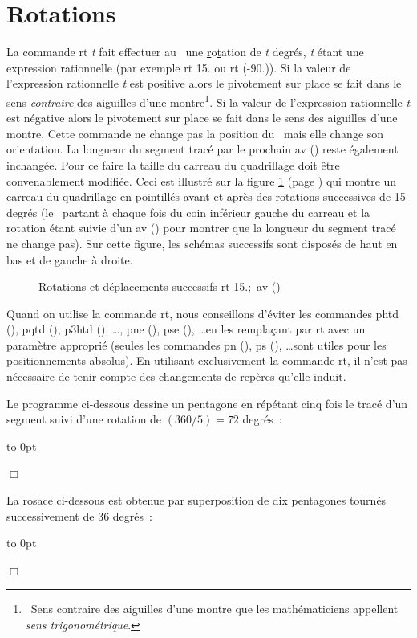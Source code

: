 \section{Rotations}
La commande {\idt rt} {\em t} fait effectuer au \robot\ une \underline{r}o\underline{t}ation de {\em t} degrés,
{\em t} étant une expression rationnelle (par exemple {\idt rt 15.} ou {\idt rt (-90.)}).
Si la valeur de l'expression rationnelle {\em t} est positive alors le pivotement sur place se fait dans le sens 
{\em contraire} des aiguilles d'une montre\footnote{\ Sens contraire des aiguilles d'une montre que les mathématiciens
appellent {\em sens trigonométrique}.}. Si la valeur de l'expression rationnelle {\em t} est négative alors le pivotement sur 
place se fait dans le sens des ai\-guil\-les d'une montre. Cette commande ne change pas la position du \robot\ mais elle change
son orientation. La longueur du segment tracé par le prochain {\idt av ()} reste également inchangée. Pour ce faire la taille du 
carreau du quadrillage doit être convenablement modifiée. Ceci est illustré sur la figure \ref{fig:rtexp} 
(page \pageref{fig:rtexp}) qui montre  un carreau du quadrillage en pointillés avant et après des rotations successives de
15 degrés (le \robot\ partant à chaque fois du coin inférieur gauche du carreau et la rotation étant suivie d'un {\idt av ()} pour montrer 
que la longueur du segment tracé ne change pas). Sur cette figure, les 
schémas successifs sont disposés de haut en bas et de gauche à droite.
\begin{figure}[htbp]
 \caption{Rotations et déplacements successifs {\idt rt 15.;\ av ()}}\label{fig:rtexp}
\end{figure}

Quand on utilise la commande {\idt rt}, nous conseillons d'éviter les commandes {\idt phtd ()}, 
{\idt pqtd ()},  {\idt p3htd ()}, \ldots, {\idt pne ()}, {\idt pse ()}, \ldots en les remplaçant par {\idt rt} avec un paramètre
approprié (seules les commandes {\idt pn ()}, {\idt ps ()}, \ldots sont utiles pour les positionnements absolus). 
En utilisant exclusivement la commande {\idt  rt}, il n'est pas nécessaire de tenir 
compte des changements de repères  qu'elle induit. 
\begin{exemple}[Pentagone]{\rm
Le programme ci-dessous dessine un pentagone en répétant cinq fois le tracé d'un segment suivi
d'une rotation de $(360 / 5) = 72$ degrés~:

 {\raggedright 
 \vbox to 0pt{}%
 
 }
\noindent $\Box$ }\end{exemple}
\begin{exemple}{\rm
La rosace ci-dessous est obtenue par superposition de dix pentagones tournés successivement de 36 degrés~:

 {\raggedright 
 \vbox to 0pt{}%
 
 }
\noindent $\Box$ }\end{exemple}

